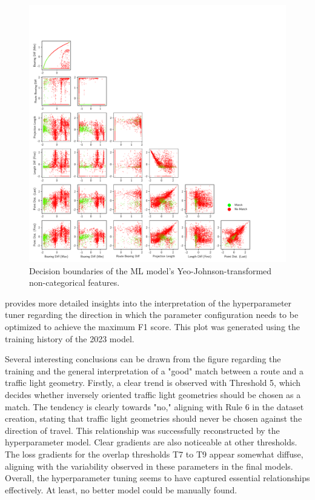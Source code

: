 \begin{figure}[H]
\centering 
\includegraphics[width=\linewidth,bb=0 0 760 760]{images/decision-boundaries.pdf}
\caption{Decision boundaries of the ML model's Yeo-Johnson-transformed non-categorical features.}
\label{fig:ml-model-decision-boundaries}
\end{figure}

 provides more detailed insights into the interpretation of the hyperparameter tuner regarding the direction in which the parameter configuration needs to be optimized to achieve the maximum F1 score. This plot was generated using the training history of the 2023 model.

Several interesting conclusions can be drawn from the figure regarding the training and the general interpretation of a "good" match between a route and a traffic light geometry. Firstly, a clear trend is observed with Threshold 5, which decides whether inversely oriented traffic light geometries should be chosen as a match. The tendency is clearly towards "no," aligning with Rule 6 in the dataset creation, stating that traffic light geometries should never be chosen against the direction of travel. This relationship was successfully reconstructed by the hyperparameter model. Clear gradients are also noticeable at other thresholds. The loss gradients for the overlap thresholds T7 to T9 appear somewhat diffuse, aligning with the variability observed in these parameters in the final models. Overall, the hyperparameter tuning seems to have captured essential relationships effectively. At least, no better model could be manually found.

